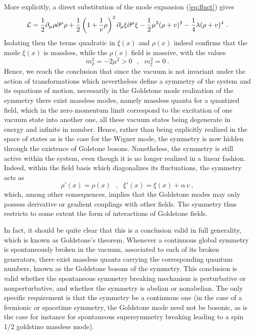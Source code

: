 \documentclass[a4paper,11pt]{article}
\begin{document}
More explicitly, a direct substitution of the mode expansion (\ref{eq:fluct})
gives
\begin{equation}
{\cal L}=\frac{1}{2}\partial_\mu\rho\partial^\mu\rho+
\frac{1}{2}\left(1+\frac{1}{v}\rho\right)^2\partial_\mu\xi\partial^\mu\xi
-\frac{1}{2}\mu^2(\rho+v)^2-\frac{1}{4}\lambda(\rho+v)^4\ .
\end{equation}
Isolating then the terms quadratic in $\xi(x)$ and $\rho(x)$ indeed confirms
that the mode $\xi(x)$ is massless, while the $\rho(x)$ field is massive, 
with the values
\begin{equation}
m^2_\rho=-2\mu^2>0\ \ \ ,\ \ \ 
m^2_\xi=0\ .
\end{equation}
Hence, we reach the conclusion that since the vacuum is not invariant
under the action of transformations which nevertheless define a symmetry
of the system and its equations of motion, necessarily in the Goldstone
mode rea\-li\-zation of the symmetry there exist massless modes, namely 
massless quanta for a quantized field, which in the zero momentum limit 
correspond to the excitation of one vacuum state into another one, all 
these vacuum states being degenerate in energy and infinite in number. 
Hence, rather than being explicitly realized in the space of states as is 
the case for the Wigner mode, the symmetry is now hidden through the 
existence of Golstone bosons. Nonetheless, the symmetry is still active 
within the system, even though it is no longer realized in a linear fashion. 
Indeed, within the field basis which diagonalizes its fluctuations, 
the symmetry acts as
\begin{equation}
\rho'(x)=\rho(x)\ \ \ ,\ \ \ \xi'(x)=\xi(x)+\alpha\,v\ ,
\end{equation}
which, among other consequences, implies that the Goldstone modes may
only possess derivative or gradient couplings with other fields.
The symmetry thus restricts to some extent the form of interactions
of Goldstone fields.

In fact, it should be quite clear that this is a conclusion valid in full
generality, which is known as Goldstone's theorem. Whenever a continuous
global symmetry is spontaneously broken in the vacuum, associated to each
of its broken generators, there exist massless quanta carrying the
cor\-res\-pon\-ding quantum numbers, known as the Goldstone bosons of the
symmetry. This conclusion is valid whether the spontaneous symmetry
breaking mechanism is perturbative or nonperturbative, and whether the
symmetry is abelian or nonabelian. The only specific requirement is that
the symmetry be a con\-ti\-nuous one (in the case of a fermionic or spacetime
symmetry, the Goldstone mode need not be bosonic, as is the case for instance
for spontaneous supersymmetry breaking leading to a spin 1/2 goldstino
massless mode).
\end{document}
